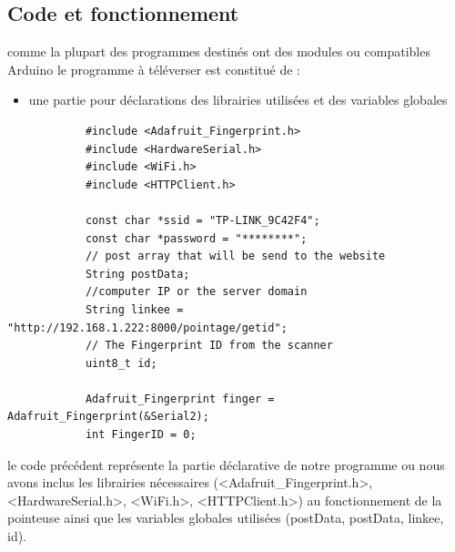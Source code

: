     \subsection{Code et fonctionnement}    
    comme la plupart des programmes destinés ont des modules ou compatibles Arduino le programme à téléverser est constitué de : 
    
    \begin{itemize}
        \item [\textbullet] une partie pour déclarations des librairies utilisées et des variables globales
    \end{itemize}
    \begin{verbatim}
            #include <Adafruit_Fingerprint.h>
            #include <HardwareSerial.h>
            #include <WiFi.h>
            #include <HTTPClient.h>

            const char *ssid = "TP-LINK_9C42F4";
            const char *password = "********";
            // post array that will be send to the website
            String postData;    
            //computer IP or the server domain 
            String linkee = "http://192.168.1.222:8000/pointage/getid"; 
            // The Fingerprint ID from the scanner
            uint8_t id; 

            Adafruit_Fingerprint finger = Adafruit_Fingerprint(&Serial2);
            int FingerID = 0;

        \end{verbatim}
    le code précédent représente la partie déclarative de notre programme ou nous avons inclus les librairies nécessaires (<Adafruit\_Fingerprint.h>, <HardwareSerial.h>, <WiFi.h>, <HTTPClient.h>) au fonctionnement de la pointeuse ainsi que les variables globales utilisées (postData, postData, linkee, id).
        
